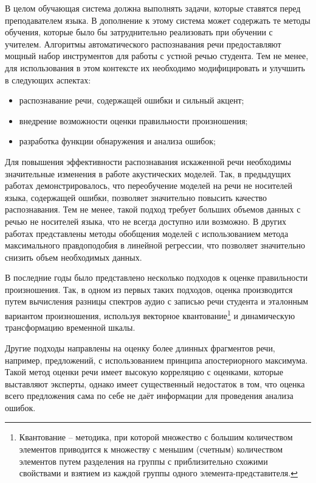 В целом обучающая система должна выполнять задачи, которые ставятся перед преподавателем языка. В дополнение к этому система может содержать те методы обучения, которые было бы затруднительно реализовать при обучении с учителем. Алгоритмы автоматического распознавания речи предоставляют мощный набор инструментов для работы с устной речью студента. Тем не менее, для использования в этом контексте их необходимо модифицировать и улучшить в следующих аспектах:
\begin{itemize}
	\item распознавание речи, содержащей ошибки и сильный акцент;
	\item внедрение возможности оценки правильности произношения;
	\item разработка функции обнаружения и анализа ошибок;
\end{itemize}

Для повышения эффективности распознавания искаженной речи необходимы значительные изменения в работе акустических моделей. Так, в предыдущих работах демонстрировалось\cite{ehsani1997subarashii}, что переобучение моделей на речи не носителей языка, содержащей ошибки, позволяет значительно повысить качество распознавания. Тем не менее, такой подход требует больших объемов данных с речью не носителей языка, что не всегда доступно или возможно. В других работах\cite{thelen1997speaker} представлены методы обобщения моделей с использованием метода максимального правдоподобия в линейной регрессии, что позволяет значительно снизить объем необходимых данных.

В последние годы было представлено несколько подходов к оценке правильности произношения. Так, в одном из первых таких подходов\cite{hamada1993automatic}, оценка производится путем вычисления разницы спектров аудио с записью речи студента и эталонным вариантом произношения, используя векторное квантование\footnote{Квантование -- методика, при которой множество с большим количеством элементов приводится к множеству с меньшим (счетным) количеством элементов путем разделения на группы с приблизительно схожими свойствами и взятием из каждой группы одного элемента-представителя.} и динамическую трансформацию временной шкалы.

Другие подходы\cite{neumeyer1996automatic,franco1997automatic} направлены на оценку более длинных фрагментов речи, например, предложений, с использованием принципа апостериорного максимума\cite{wiki:Maximum_a_posteriori_estimation}. Такой метод оценки речи имеет высокую корреляцию с оценками, которые выставляют эксперты, однако имеет существенный недостаток в том, что оценка всего предложения сама по себе не даёт информации для проведения анализа ошибок.

